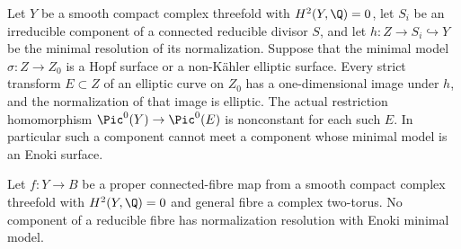 \begin{proposition}\label{cdp:st:C.2.INT.1}


Let $Y$ be a smooth compact complex threefold with
$H^2(Y,\Q)=0$, let $S_i$ be an irreducible component of
a connected reducible divisor $S$, and let
$h:Z\to S_i\hookrightarrow Y$ be the minimal resolution
of its normalization. Suppose that the minimal model
$\sigma:Z\to Z_0$ is a Hopf surface or a non-K\"ahler
elliptic surface. Every strict transform $E\subset Z$ of
an elliptic curve on $Z_0$ has a one-dimensional image
under $h$, and the normalization of that image is elliptic.
The actual restriction homomorphism
$\Pic^0(Y)\to\Pic^0(E)$ is nonconstant for each such $E$.
In particular such a component cannot meet a component
whose minimal model is an Enoki surface.
\end{proposition}

\begin{proposition}\label{cdp:st:C.2.INT.2}


Let $f:Y\to B$ be a proper connected-fibre map from a
smooth compact complex threefold with $H^2(Y,\Q)=0$
and general fibre a complex two-torus. No component
of a reducible fibre has normalization resolution
with Enoki minimal model.
\end{proposition}

